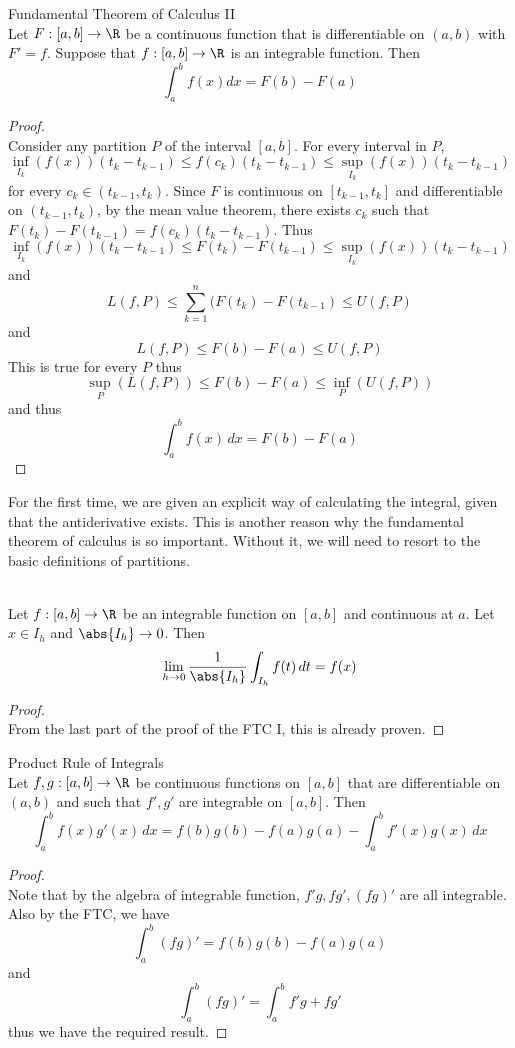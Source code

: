 \documentclass[a4paper]{article}
\begin{document}
\begin{thm}{Fundamental Theorem of Calculus II}{}\\ Let $F:[a,b]\to\R$ be a continuous function that is differentiable on $(a,b)$ with $F'=f$. Suppose that $f:[a,b]\to\R$ is an integrable function. Then $$\int_{a}^{b}f(x)dx=F(b)-F(a)$$ 
\begin{proof}\\
Consider any partition $P$ of the interval $[a,b]$. For every interval in $P$, $$\inf_{I_k}(f(x))(t_k-t_{k-1})\leq f(c_k)(t_k-t_{k-1})\leq\sup_{I_k}(f(x))(t_k-t_{k-1})$$
for every $c_k\in(t_{k-1},t_k)$. Since $F$ is continuous on $[t_{k-1},t_k]$ and differentiable on $(t_{k-1},t_k)$, by the mean value theorem, there exists $c_k$ such that $F(t_k)-F(t_{k-1})=f(c_k)(t_k-t_{k-1})$. Thus $$\inf_{I_k}(f(x))(t_k-t_{k-1})\leq F(t_k)-F(t_{k-1})\leq\sup_{I_k}(f(x))(t_k-t_{k-1})$$ and $$L(f,P)\leq\sum_{k=1}^n(F(t_k)-F(t_{k-1})\leq U(f,P)$$ and $$L(f,P)\leq F(b)-F(a)\leq U(f,P)$$ This is true for every $P$ thus $$\sup_{P}(L(f,P))\leq F(b)-F(a)\leq\inf_{P}(U(f,P))$$ and thus $$\int_a^bf(x)\,dx=F(b)-F(a)$$
\end{proof}
\end{thm}

For the first time, we are given an explicit way of calculating the integral, given that the antiderivative exists. This is another reason why the fundamental theorem of calculus is so important. Without it, we will need to resort to the basic definitions of partitions. 

\begin{thm}{}{}\\ Let $f:[a,b]\to\R$ be an integrable function on $[a,b]$ and continuous at $a$. Let $x\in I_h$ and $\abs{I_h}\to 0$. Then $$\lim_{h\to 0}\frac{1}{\abs{I_h}}\int_{I_h}f(t)\,dt=f(x)$$ 
\begin{proof}\\ From the last part of the proof of the FTC I, this is already proven. 
\end{proof}
\end{thm}

\begin{thm}{Product Rule of Integrals}{}\\ Let $f,g:[a,b]\to\R$ be continuous functions on $[a,b]$ that are differentiable on $(a,b)$ and such that $f',g'$ are integrable on $[a,b]$. Then $$\int_{a}^{b}f(x)g'(x)\,dx=f(b)g(b)-f(a)g(a)-\int_{a}^{b}f'(x)g(x)\,dx$$ 
\begin{proof}\\ Note that by the algebra of integrable function, $f'g,fg',(fg)'$ are all integrable. Also by the FTC, we have $$\int_a^b(fg)'=f(b)g(b)-f(a)g(a)$$ and $$\int_a^b(fg)'=\int_a^bf'g+fg'$$ thus we have the required result. 
\end{proof}
\end{thm}
\end{document}

